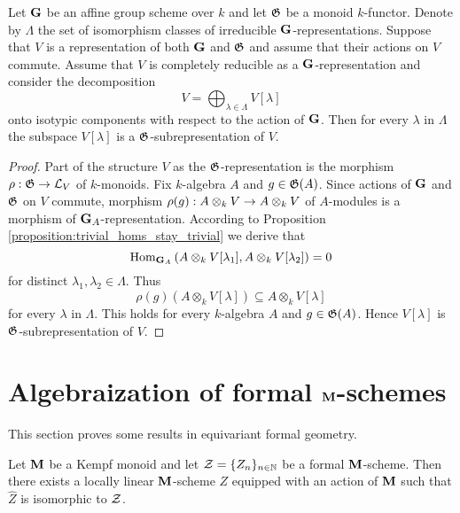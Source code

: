 \begin{corollary}\label{corollary:commuting_action_preserves_isotypic_decomposition}
Let $\mathbf{G}$ be an affine group scheme over $k$ and let ${\mathfrak G}$ be a monoid $k$-functor. Denote by $\Lambda$ the set of isomorphism classes of irreducible $\mathbf{G}$-representations. Suppose that $V$ is a representation of both $\mathbf{G}$ and ${\mathfrak G}$ and assume that their actions on $V$ commute. Assume that $V$ is completely reducible as a $\mathbf{G}$-representation and consider the decomposition
$$V = \bigoplus_{\lambda\in \Lambda}V[\lambda]$$
onto isotypic components with respect to the action of $\mathbf{G}$. Then for every $\lambda$ in $\Lambda$ the subspace $V[\lambda]$ is a ${\mathfrak G}$-subrepresentation of $V$.
\end{corollary}
\begin{proof}
Part of the structure $V$ as the ${\mathfrak G}$-representation is the morphism $\rho:{\mathfrak G} \rightarrow {\mathcal L}_V$ of $k$-monoids. Fix $k$-algebra $A$ and $g\in {\mathfrak G}(A)$. Since actions of $\mathbf{G}$ and ${\mathfrak G}$ on $V$ commute, morphism $\rho(g):A\otimes_kV\rightarrow A\otimes_kV$ of $A$-modules is a morphism of $\mathbf{G}_A$-representation. According to Proposition \ref{proposition:trivial_homs_stay_trivial} we derive that
$$\mathrm{Hom}_{\mathbf{G}_A}\left(A\otimes_kV[\lambda_1],A\otimes_kV[\lambda_2]\right) = 0$$
for distinct $\lambda_1,\lambda_2\in \Lambda$. Thus
$$\rho(g)\left(A \otimes_k V[\lambda] \right)\subseteq A \otimes_kV[\lambda]$$
for every $\lambda$ in $\Lambda$. This holds for every $k$-algebra $A$ and $g\in {\mathfrak G}(A)$. Hence $V[\lambda]$ is ${\mathfrak G}$-subrepresentation of $V$.
\end{proof}

\section{Algebraization of formal $\mathbf{M}$-schemes}
\noindent
This section proves some results in equivariant formal geometry. 

\begin{theorem}\label{theorem:every_formal_over_kempf_monoid_is_formal_neighborhood}
Let $\mathbf{M}$ be a Kempf monoid and let ${\mathcal Z} = \{Z_n\}_{n\in {\mathbb N}}$ be a formal $\mathbf{M}$-scheme. Then there exists a locally linear $\mathbf{M}$-scheme $Z$ equipped with an action of $\mathbf{M}$ such that $\widehat{Z}$ is isomorphic to ${\mathcal Z}$.
\end{theorem}

